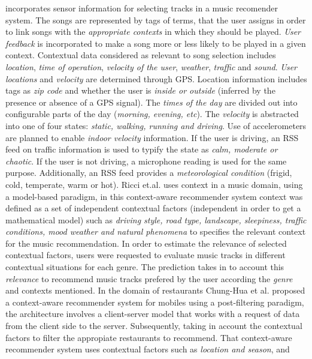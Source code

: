 incorporates sensor information for selecting tracks in a music recomender system.
The songs are represented by tags of terms, that the user assigns in order to link
songs with the \textit{appropriate contexts} in which they should be played.
\textit{User feedback} is incorporated to make a song more or less likely to be
played in a given context. Contextual data considered as relevant to song selection
includes \textit{location}, \textit{time of operation}, \textit{velocity of the user}, 
\textit{weather}, \textit{traffic} and \textit{sound}. \textit{User locations} and 
\textit{velocity} are determined through GPS.
Location information includes tags as \textit{zip code} and whether the
user is \textit{inside or outside} (inferred by the presence or absence of a
GPS signal). The \textit{times of the day} are divided out into configurable
parts of the day (\textit{morning, evening, etc}). The \textit{velocity} is 
abstracted into one of four states: \textit{static, walking, running and driving}.  
Use of accelerometers are planned to enable \textit{indoor velocity}
information. If the user is driving, an RSS feed on traffic information 
is used to typify the state as \textit{calm, moderate or chaotic}. If the user is not
driving, a microphone reading is used for the same purpose.
Additionally, an RSS feed provides a \textit{meteorological condition} (frigid,
cold, temperate, warm or hot).
Ricci et.al. \cite{baltrunas2011incarmusic} uses
context in a music domain, using a model-based paradigm, in this
context-aware recommender system context was defined as a set of
independent contextual factors (independent in order to get a
mathematical model) such as \textit{driving style, road type,
landscape, sleepiness, traffic conditions, mood weather and natural
phenomena} to specifies the relevant context for the music
recommendation. In order to estimate the relevance of selected
contextual factors, users were requested to evaluate music tracks
in different contextual situations for each genre. The prediction
takes in to account this \textit{relevance} to recommend music tracks 
prefered by the user according the \textit{genre} and contexts mentioned.
In the domain of restaurants Chung-Hua et al.\cite{chu2013chinese} proposed a
context-aware recommender system for mobiles using a post-filtering
paradigm, the architecture involves a  client-server model that works
with a request of data from the client side to the server.
Subsequently, taking in account the contextual factors to filter the
appropiate restaurants to recommend. That context-aware recommender
system uses contextual factors such as \textit{location and season}, and
